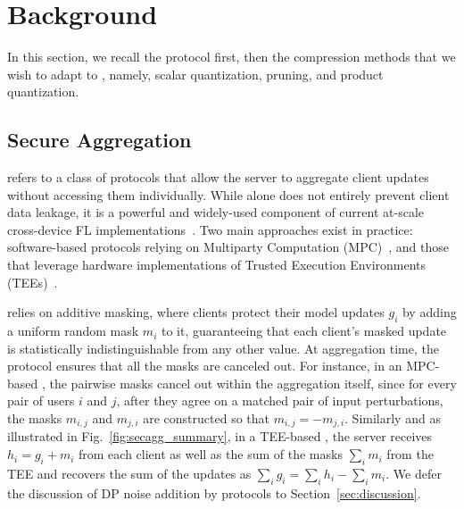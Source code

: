 \newcommand{\parai}[1]{\noindent\textit{#1}}

\section{Background}
\label{sec:background}

In this section, we recall the \SecAgg protocol first, then the compression methods that we wish to adapt to \SecAgg, namely, scalar quantization, pruning, and product quantization.

\subsection{Secure Aggregation}
\label{subsec:secagg}

\SecAgg refers to a class of protocols that allow the server to aggregate client updates without accessing them individually. While \SecAgg alone does not entirely prevent client data leakage, it is a powerful and widely-used component of current at-scale cross-device FL implementations~\cite{kairouz2019advances}. Two main approaches exist in practice: software-based protocols relying on Multiparty Computation (MPC)~\cite{bonavitz2019federated,bell2020secure,LightSecAgg}, and those that leverage hardware implementations of Trusted Execution Environments (TEEs)~\cite{huba2021papaya}.


\SecAgg relies on additive masking, where clients protect their model updates $g_i$ by adding a uniform random mask $m_i$ to it, guaranteeing that each client’s masked update is statistically indistinguishable from any other value.
At aggregation time, the protocol ensures that all the masks are canceled out. For instance, in an MPC-based \SecAgg, the pairwise masks cancel out within the aggregation itself, since for every pair of users $i$ and $j$, after they agree on a matched pair of input perturbations, the masks $m_{i,j}$ and $m_{j,i}$ are constructed so that $m_{i,j}=-m_{j,i}$.
Similarly and as illustrated in Fig.~\ref{fig:secagg_summary}, in a TEE-based \SecAgg, the server receives $h_i = g_i + m_i$ from each client as well as the sum of the masks $\sum_i m_i$ from the TEE and recovers the sum of the updates as
$
      \sum_i g_i = \sum_i h_i - \sum_i m_i.
$
We defer the discussion of DP noise addition by \SecAgg protocols to Section~\ref{sec:discussion}.


